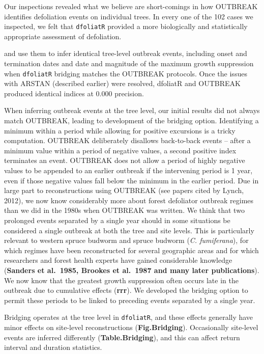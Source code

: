 \documentclass[review]{elsarticle} %
\begin{document}
Our inspections revealed what we believe are short-comings in how OUTBREAK identifies defoliation events on individual trees. In every one of the 102 cases we inspected, we felt that \texttt{dfoliatR} provided a more biologically and statistically appropriate assessment of defoliation.

and use them to infer identical tree-level outbreak events, including onset and termination dates and date and magnitude of the maximum growth suppression when \texttt{dfoliatR} bridging matches the OUTBREAK protocols. Once the issues with ARSTAN (described earlier) were resolved, dfoliatR and OUTBREAK produced identical indices at 0.000 precision.

When inferring outbreak events at the tree level, our initial results did not always match OUTBREAK, leading to development of the bridging option. Identifying a minimum within a period while allowing for positive excursions is a tricky computation. OUTBREAK deliberately disallows back-to-back events -- after a minimum value within a period of negative values, a second positive index terminates an event. OUTBREAK does not allow a period of highly negative values to be appended to an earlier outbreak if the intervening period is 1 year, even if those negative values fall below the minimum in the earlier period. Due in large part to reconstructions using OUTBREAK (see papers cited by Lynch, 2012), we now know considerably more about forest defoliator outbreak regimes than we did in the 1980s when OUTBREAK was written. We think that two prolonged events separated by a single year should in some situations be considered a single outbreak at both the tree and site levels. This is particularly relevant to western spruce budworm and spruce budworm (\emph{C. fumiferana}), for which regimes have been reconstructed for several geographic areas and for which researchers and forest health experts have gained considerable knowledge (\textbf{Sanders et al.~1985, Brookes et al.~1987 and many later publications}). We now know that the greatest growth suppression often occurs late in the outbreak due to cumulative effects (\textbf{rrr}). We developed the bridging option to permit these periods to be linked to preceding events separated by a single year.

Bridging operates at the tree level in \texttt{dfoliatR}, and these effects generally have minor effects on site-level reconstructions (\textbf{Fig.Bridging}). Occasionally site-level events are inferred differently (\textbf{Table.Bridging}), and this can affect return interval and duration statistics.
\end{document}

